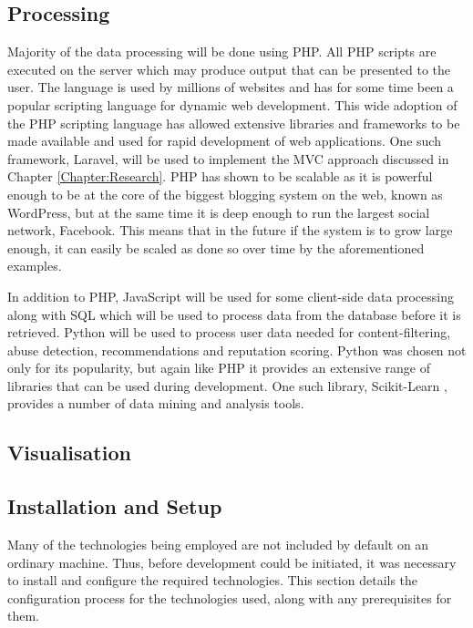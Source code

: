 \subsection{Processing}
Majority of the data processing will be done using PHP. All PHP scripts are executed on the server which may produce output that can be presented to the user. The language is used by millions of websites and has for some time been  a popular scripting language for dynamic web development. This wide adoption of the PHP scripting language has allowed extensive libraries and frameworks to be made available and used for rapid development of web applications. One such framework, Laravel, will be used to implement the MVC approach discussed in Chapter \ref{Chapter:Research}. PHP has shown to be scalable as it is powerful enough to be at the core of the biggest blogging system on the web, known as WordPress, but at the same time it is deep enough to run the largest social network, Facebook\cite{W3Schools:PHP_Intro, Wiki:WordPress, Fastcompany:Facebook_PHP}. This means that in the future if the system is to grow large enough, it can easily be scaled as done so over time by the aforementioned examples. 

In addition to PHP, JavaScript will be used for some client-side data processing along with SQL which will be used to process data from the database before it is retrieved. Python will be used to process user data needed for content-filtering, abuse detection, recommendations and reputation scoring. Python was chosen not only for its popularity, but again like PHP it provides an extensive range of libraries that can be used during development. One such library, Scikit-Learn \cite{scikit:home}, provides a number of data mining and analysis tools. 

\subsection{Visualisation}

\subsection{Installation and Setup}
Many of the technologies being employed are not included by default on an ordinary machine. Thus, before development could be initiated, it was necessary to install and configure the required technologies. This section details the configuration process for the technologies used, along with any prerequisites for them.

